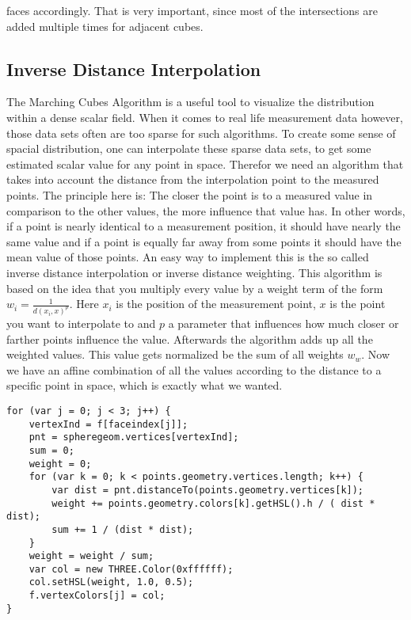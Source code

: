 faces accordingly. That is very important, since most of the intersections are added multiple times for adjacent cubes.
\subsection{Inverse Distance Interpolation}
The Marching Cubes Algorithm is a useful tool to visualize the distribution within a dense scalar field. When it comes to real life measurement data however, those data sets often are too sparse for such algorithms. To create some sense of spacial distribution, one can interpolate these sparse data sets, to get some estimated scalar value for any point in space. Therefor we need an algorithm that takes into account the distance from the interpolation point to the measured points. The principle here is: The closer the point is to a measured value in comparison to the other values, the more influence that value has. In other words, if a point is nearly identical to a measurement position, it should have nearly the same value and if a point is equally far away from some points it should have the mean value of those points. An easy way to implement this is the so called inverse distance interpolation or inverse distance weighting. This algorithm is based on the idea that you multiply every value by a weight term of the form $w_i = \frac{1}{d(x_i,x)^p}$. Here $x_i$ is the position of the measurement point, $x$ is the point you want to interpolate to and $p$ a parameter that influences how much closer or farther points influence the value. Afterwards the algorithm adds up all the weighted values. This value gets normalized be the sum of all weights $w_w$. Now we have an affine combination of all the values according to the distance to a specific point in space, which is exactly what we wanted.
\lstset{
caption=Building Loader,
label=list:InvDist,
language=JavaScript}
\begin{lstlisting}[float=bph]
for (var j = 0; j < 3; j++) {
    vertexInd = f[faceindex[j]];
    pnt = spheregeom.vertices[vertexInd];
    sum = 0;
    weight = 0;
    for (var k = 0; k < points.geometry.vertices.length; k++) {
        var dist = pnt.distanceTo(points.geometry.vertices[k]);
        weight += points.geometry.colors[k].getHSL().h / ( dist * dist);
        sum += 1 / (dist * dist);
    }
    weight = weight / sum;
    var col = new THREE.Color(0xffffff);
    col.setHSL(weight, 1.0, 0.5);
    f.vertexColors[j] = col;
}
\end{lstlisting}

